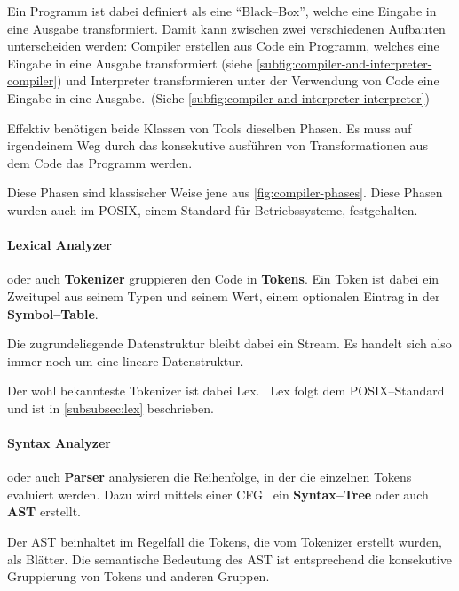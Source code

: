 Ein Programm ist dabei definiert als eine \enquote{Black--Box}, welche eine Eingabe in eine Ausgabe transformiert.
Damit kann zwischen zwei verschiedenen Aufbauten unterscheiden werden: Compiler erstellen aus Code ein Programm, welches eine Eingabe in eine Ausgabe transformiert (siehe \autoref{subfig:compiler-and-interpreter-compiler}) und Interpreter transformieren unter der Verwendung von Code eine Eingabe in eine Ausgabe.~(Siehe \autoref{subfig:compiler-and-interpreter-interpreter})

Effektiv benötigen beide Klassen von Tools dieselben Phasen.
Es muss auf irgendeinem Weg durch das konsekutive ausführen von Transformationen aus dem Code das Programm werden.

Diese Phasen sind klassischer Weise jene aus \autoref{fig:compiler-phases}.
Diese Phasen wurden auch im \ac{POSIX}, einem Standard für Betriebssysteme, festgehalten.~\autocite{ieee-sa-1993}

\paragraph{Lexical Analyzer} oder auch \textbf{Tokenizer} gruppieren den Code in \textbf{Tokens}.
Ein Token ist dabei ein Zweitupel aus seinem Typen und seinem Wert, einem optionalen Eintrag in der \textbf{Symbol--Table}.

Die zugrundeliegende Datenstruktur bleibt dabei ein Stream.
Es handelt sich also immer noch um eine lineare Datenstruktur.

Der wohl bekannteste Tokenizer ist dabei Lex.~\autocite{wikipedia-contributors-2024G}
Lex folgt dem \acs{POSIX}--Standard und ist in \autoref{subsubsec:lex} beschrieben.

\paragraph{Syntax Analyzer} oder auch \textbf{Parser} analysieren die Reihenfolge, in der die einzelnen Tokens evaluiert werden.
Dazu wird mittels einer \ac{CFG}~\autocite{wikipedia-contributors-2024H} ein \textbf{Syntax--Tree} oder auch \textbf{\ac{AST}} erstellt.

Der \ac{AST} beinhaltet im Regelfall die Tokens, die vom Tokenizer erstellt wurden, als Blätter.
Die semantische Bedeutung des \ac{AST} ist entsprechend die konsekutive Gruppierung von Tokens und anderen Gruppen.

